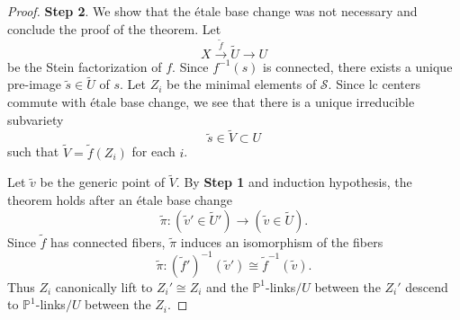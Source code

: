 \documentclass[11pt]{amsart}
\numberwithin{equation}{section}
\theoremstyle{definition}
\theoremstyle{definition}
\theoremstyle{definition}
\begin{document}
\begin{proof}
\medskip

\noindent\textbf{Step 2}. We show that the \'etale base change was not necessary and conclude the proof of the theorem. Let 
$$X\xrightarrow{\tilde f}\tilde U\rightarrow U$$
be the Stein factorization of $f$. Since $f^{-1}(s)$ is connected, there exists a unique pre-image $\tilde s\in\tilde U$ of $s$. Let $Z_i$ be the minimal elements of $\mathcal{S}$. Since lc centers commute with \'etale base change, we see that there is a unique irreducible subvariety 
$$\tilde s\in \tilde V\subset U$$
such that $\tilde V=\tilde f(Z_i)$ for each $i$. 

Let $\tilde v$ be the generic point of $\tilde V$. By \textbf{Step 1} and induction hypothesis, the theorem holds after an \'etale base change 
$$\tilde\pi: (\tilde v'\in \tilde U')\rightarrow (\tilde v\in\tilde U).$$
Since $\tilde f$ has connected fibers, $\tilde\pi$ induces an isomorphism of the fibers
$$\tilde\pi: (\tilde f')^{-1}(\tilde v')\cong\tilde f^{-1}(\tilde v).$$
Thus $Z_i$ canonically lift to $Z_i'\cong Z_i$ and the $\mathbb P^1$-links$/U$ between the $Z_i'$ descend
to $\mathbb P^1$-links$/U$ between the $Z_i$.
\end{proof}
\end{document}
